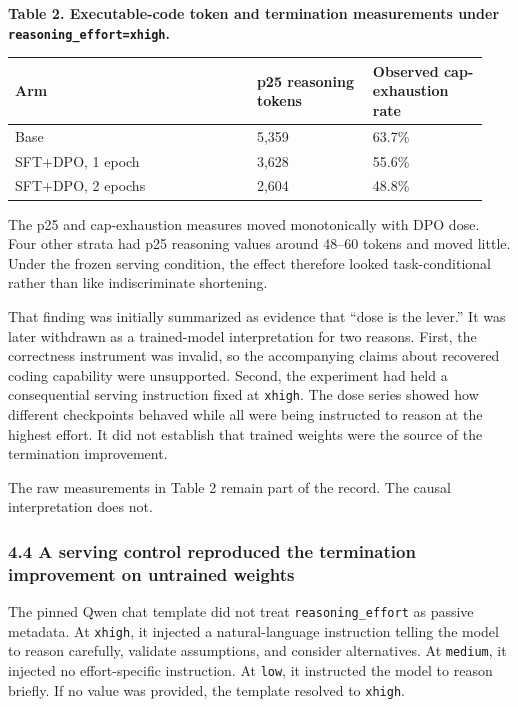 \documentclass[
]{article}
\newcounter{none} %
\begin{document}
\textbf{Table 2. Executable-code token and termination measurements
under \texttt{reasoning\_effort=xhigh}.}

{\def\LTcaptype{none} %
\begin{longtable}[]{@{}p{0.48\linewidth}p{0.23\linewidth}p{0.23\linewidth}@{}}
\toprule\noalign{}
Arm & p25 reasoning tokens & Observed cap-exhaustion rate \\
\midrule\noalign{}
\endhead
\bottomrule\noalign{}
\endlastfoot
Base & 5,359 & 63.7\% \\
SFT+DPO, 1 epoch & 3,628 & 55.6\% \\
SFT+DPO, 2 epochs & 2,604 & 48.8\% \\
\end{longtable}
}

The p25 and cap-exhaustion measures moved monotonically with DPO dose.
Four other strata had p25 reasoning values around 48--60 tokens and
moved little. Under the frozen serving condition, the effect therefore
looked task-conditional rather than like indiscriminate shortening.

That finding was initially summarized as evidence that ``dose is the
lever.'' It was later withdrawn as a trained-model interpretation for
two reasons. First, the correctness instrument was invalid, so the
accompanying claims about recovered coding capability were unsupported.
Second, the experiment had held a consequential serving instruction
fixed at \texttt{xhigh}. The dose series showed how different
checkpoints behaved while all were being instructed to reason at the
highest effort. It did not establish that trained weights were the
source of the termination improvement.

The raw measurements in Table 2 remain part of the record. The causal
interpretation does not.

\subsubsection{4.4 A serving control reproduced the termination
improvement on untrained
weights}\label{44-a-serving-control-reproduced-the-termination-improvement-on-untrained-weights}

The pinned Qwen chat template did not treat \texttt{reasoning\_effort}
as passive metadata. At \texttt{xhigh}, it injected a natural-language
instruction telling the model to reason carefully, validate assumptions,
and consider alternatives. At \texttt{medium}, it injected no
effort-specific instruction. At \texttt{low}, it instructed the model to
reason briefly. If no value was provided, the template resolved to
\texttt{xhigh}.
\end{document}
